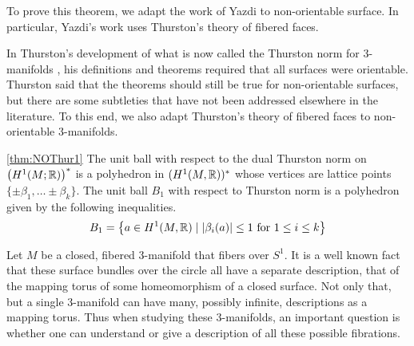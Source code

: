 To prove this theorem, we adapt the work of Yazdi \cite{yazdi2018pseudo} to non-orientable surface.  In particular, Yazdi's work uses Thurston's theory of fibered faces.  

 In Thurston's development of what is now called the Thurston norm for 3-manifolds \cite{thurston1986norm}, his definitions and theorems required that all surfaces were orientable.  Thurston said that the theorems should still be true for non-orientable surfaces, but there are some subtleties that have not been addressed elsewhere in the literature.  To this end, we also adapt Thurston's theory of fibered faces to non-orientable 3-manifolds.

\begin{manualtheorem}{\ref{thm:NOThur1}}
  The unit ball with respect to the dual Thurston norm on $\left( H^1(M; \mathbb{R}) \right)^{\ast}$ is a polyhedron in $(H^1(M,\mathbb{R}))^\ast$
  whose vertices are lattice points $\{\pm \beta_1, \ldots \pm \beta_k\}$. The unit ball $B_1$ with respect to
  Thurston norm is a polyhedron given by the following inequalities.
  \begin{align*}
    B_1 = \left\{ a\in H^1(M,\mathbb{R}) \mid \left| \beta_i(a) \right| \leq 1 \text{ for $1\leq i \leq k$} \right\}
  \end{align*}
\end{manualtheorem}


Let $M$ be a closed, fibered 3-manifold that fibers over $S^1$. It is a well known fact that these surface
bundles over the circle all have a separate description, that of the mapping torus of some homeomorphism of a
closed surface. Not only that, but a single 3-manifold can have many, possibly infinite, descriptions as a
mapping torus. Thus when studying these 3-manifolds, an important question is whether one can understand or
give a description of all these possible fibrations.


